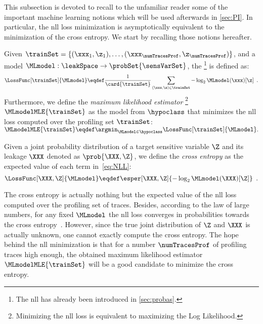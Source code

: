 This subsection is devoted to recall to the unfamiliar reader some of the important machine learning notions which will be used afterwards in \autoref{sec:PI}. 
In particular, the \gls{nll} loss minimization is asymptotically equivalent to the minimization of the cross entropy. 
We start by recalling those notions hereafter.
\begin{definition}
    Given \(\trainSet =  \{(\xxx_1, \z_1), \ldots, (\xxx_{\numTracesProf}, \z_{\numTracesProf})\}\), and a model \(\MLmodel: \leakSpace \rightarrow \probSet{\sensVarSet}\), the %
    \footnote{
        The \gls{nll} has already been introduced in \autoref{sec:probas}.
    }
    is defined as:
    \begin{equation}
        \LossFunc[\trainSet]{\MLmodel} \eqdef \frac{1}{\card{\trainSet}}\sum_{(\xxx, \z) \in \trainSet}
        - \log_2 \MLmodel(\xxx)[\z] \enspace .
        \label{eq:NLL}
    \end{equation}
    Furthermore, we define the \emph{maximum likelihood estimator}%
    \footnote{
        Minimizing the \gls{nll} loss is equivalent to maximizing the Log Likelihood.
    } 
    \(\MLmodelMLE{\trainSet}\) as the model from \(\hypoclass\) that minimizes the \gls{nll} loss computed over the profiling set \(\trainSet\): \(\MLmodelMLE{\trainSet} \eqdef \argmin_{\MLmodel \in \hypoclass} \LossFunc[\trainSet]{\MLmodel}.\)
    \label{def:NLL_loss}
\end{definition}

\begin{definition}
    Given a joint probability distribution of a target sensitive variable \(\Z\) and its leakage \(\XXX\) denoted as \(\prob{\XXX, \Z}\), we define the \emph{cross entropy} as the expected value of each term in~\autoref{eq:NLL}: 
    \begin{equation}
        \LossFunc[\XXX, \Z]{\MLmodel} \eqdef
        \esper[\XXX, \Z]{-\log_2 \MLmodel(\XXX)[\Z]} \enspace .
        \label{eq:general_loss}
    \end{equation}
    \label{def:Xent}
\end{definition}
The cross entropy is actually nothing but the expected value of the \gls{nll} loss computed over the profiling set of traces.
Besides, according to the law of large numbers, for any fixed \(\MLmodel\) the \gls{nll} loss converges in probabilities towards the cross entropy~\cite{shalev-shwartz_understanding_2014}.
However, since the true joint distribution of \(\Z\) and \(\XXX\) is actually unknown, one cannot exactly compute the cross entropy.
The hope behind the \gls{nll} minimization is that for a number \(\numTracesProf\) of profiling traces high enough, the obtained maximum likelihood estimator \(\MLmodelMLE{\trainSet}\) will be a good candidate to minimize the cross entropy.

